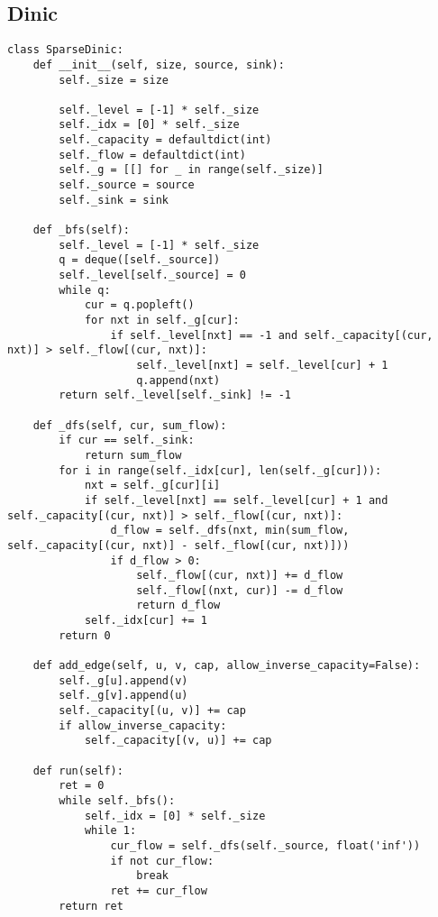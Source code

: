 \documentclass[landscape, 8pt, a4paper, oneside, twocolumn]{extarticle}
\begin{document}
\subsection{Dinic}
\begin{verbatim}
class SparseDinic:
    def __init__(self, size, source, sink):
        self._size = size

        self._level = [-1] * self._size
        self._idx = [0] * self._size
        self._capacity = defaultdict(int)
        self._flow = defaultdict(int)
        self._g = [[] for _ in range(self._size)]
        self._source = source
        self._sink = sink

    def _bfs(self):
        self._level = [-1] * self._size
        q = deque([self._source])
        self._level[self._source] = 0
        while q:
            cur = q.popleft()
            for nxt in self._g[cur]:
                if self._level[nxt] == -1 and self._capacity[(cur, nxt)] > self._flow[(cur, nxt)]:
                    self._level[nxt] = self._level[cur] + 1
                    q.append(nxt)
        return self._level[self._sink] != -1

    def _dfs(self, cur, sum_flow):
        if cur == self._sink:
            return sum_flow
        for i in range(self._idx[cur], len(self._g[cur])):
            nxt = self._g[cur][i]
            if self._level[nxt] == self._level[cur] + 1 and self._capacity[(cur, nxt)] > self._flow[(cur, nxt)]:
                d_flow = self._dfs(nxt, min(sum_flow, self._capacity[(cur, nxt)] - self._flow[(cur, nxt)]))
                if d_flow > 0:
                    self._flow[(cur, nxt)] += d_flow
                    self._flow[(nxt, cur)] -= d_flow
                    return d_flow
            self._idx[cur] += 1
        return 0

    def add_edge(self, u, v, cap, allow_inverse_capacity=False):
        self._g[u].append(v)
        self._g[v].append(u)
        self._capacity[(u, v)] += cap
        if allow_inverse_capacity:
            self._capacity[(v, u)] += cap

    def run(self):
        ret = 0
        while self._bfs():
            self._idx = [0] * self._size
            while 1:
                cur_flow = self._dfs(self._source, float('inf'))
                if not cur_flow:
                    break
                ret += cur_flow
        return ret
\end{verbatim}
\end{document}
